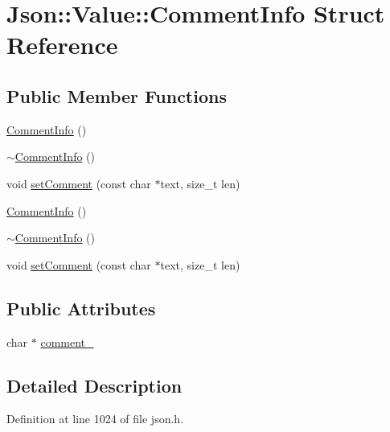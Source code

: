 \hypertarget{struct_json_1_1_value_1_1_comment_info}{}\section{Json\+:\+:Value\+:\+:Comment\+Info Struct Reference}
\label{struct_json_1_1_value_1_1_comment_info}
\subsection*{Public Member Functions}
\begin{DoxyCompactItemize}
\item 
\hyperlink{struct_json_1_1_value_1_1_comment_info_ab23b0c125695d284bded2fb106a49043}{Comment\+Info} ()
\item 
\hyperlink{struct_json_1_1_value_1_1_comment_info_ab4d0877190bdbf484e4e2a3bade42ac8}{$\sim$\+Comment\+Info} ()
\item 
void \hyperlink{struct_json_1_1_value_1_1_comment_info_a4d01c2cd8c07995969c5d636dfd4fa8c}{set\+Comment} (const char $\ast$text, size\+\_\+t len)
\item 
\hyperlink{struct_json_1_1_value_1_1_comment_info_ab23b0c125695d284bded2fb106a49043}{Comment\+Info} ()
\item 
\hyperlink{struct_json_1_1_value_1_1_comment_info_ab4d0877190bdbf484e4e2a3bade42ac8}{$\sim$\+Comment\+Info} ()
\item 
void \hyperlink{struct_json_1_1_value_1_1_comment_info_a4d01c2cd8c07995969c5d636dfd4fa8c}{set\+Comment} (const char $\ast$text, size\+\_\+t len)
\end{DoxyCompactItemize}
\subsection*{Public Attributes}
\begin{DoxyCompactItemize}
\item 
char $\ast$ \hyperlink{struct_json_1_1_value_1_1_comment_info_ac80f716e6784d896c84809f529b17d65}{comment\+\_\+}
\end{DoxyCompactItemize}


\subsection{Detailed Description}


Definition at line 1024 of file json.\+h.



